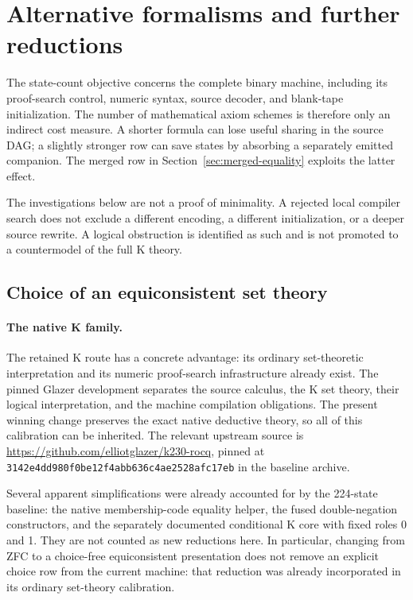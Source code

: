 \section{Alternative formalisms and further reductions}
\label{sec:exploration}

The state-count objective concerns the complete binary machine, including
its proof-search control, numeric syntax, source decoder, and blank-tape
initialization.  The number of mathematical axiom schemes is therefore
only an indirect cost measure.  A shorter formula can lose useful sharing
in the source DAG; a slightly stronger row can save states by absorbing a
separately emitted companion.  The merged row in
Section~\ref{sec:merged-equality} exploits the latter effect.

The investigations below are not a proof of minimality.  A rejected local
compiler search does not exclude a different encoding, a different
initialization, or a deeper source rewrite.  A logical obstruction is
identified as such and is not promoted to a countermodel of the full K
theory.

\subsection{Choice of an equiconsistent set theory}

\paragraph{The native K family.}
The retained K route has a concrete advantage: its ordinary
set-theoretic interpretation and its numeric proof-search infrastructure
already exist.  The pinned Glazer development separates the source
calculus, the K set theory, their logical interpretation, and the machine
compilation obligations.  The present winning change preserves the exact
native deductive theory, so all of this calibration can be inherited.
The relevant upstream source is
\url{https://github.com/elliotglazer/k230-rocq}, pinned at
\texttt{3142e4dd980f0be12f4abb636c4ae2528afc17eb} in the baseline archive.

Several apparent simplifications were already accounted for by the
224-state baseline: the native membership-code equality helper, the fused
double-negation constructors, and the separately documented conditional
K core with fixed roles 0 and 1.  They are not counted as new reductions
here.  In particular, changing from ZFC to a choice-free equiconsistent
presentation does not remove an explicit choice row from the current
machine: that reduction was already incorporated in its ordinary
set-theory calibration.

